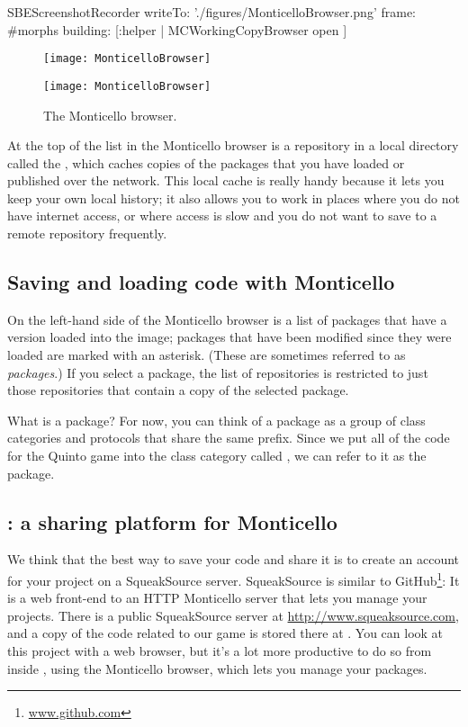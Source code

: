 \documentclass[a4paper,10pt,twoside]{book}
\begin{document}
\begin{ExecuteSmalltalkScript}
SBEScreenshotRecorder writeTo: './figures/MonticelloBrowser.png' frame: #morphs building: [:helper |
  MCWorkingCopyBrowser open
]
\end{ExecuteSmalltalkScript}
\begin{figure}[hbt]
\ifluluelse
	{\centerline {\texttt{[image: MonticelloBrowser]}}}
	{\centerline {\texttt{[image: MonticelloBrowser]}}}
\caption{The Monticello browser.
\label{fig:monticello1}}
\end{figure}

At the top of the list in the Monticello browser is a repository in a local directory called the , which caches copies of the packages that you have loaded or published over the network.
This local cache is really handy because it lets you keep your own local history; it also allows you to work in places where you do not have internet access, or where access is slow and you do not want to save to a remote repository frequently.


\subsection{Saving and loading code with Monticello}
On the left-hand side of the Monticello browser is a list of packages that have a version loaded into the image; packages that have been modified since they were loaded are marked with an asterisk.
(These are sometimes referred to as \emph{ packages}.)
If you select a package, the list of repositories is restricted to just those repositories that contain a copy of the selected package.

What is a package?
For now, you can think of a package as a group of class categories and protocols that share the same prefix.
Since we put all of the code for the Quinto game into the class category called , we can refer to it as the  package.


\subsection{: a sharing platform for Monticello}
We think that the best way to save your code and share it is to create an account for your project on a SqueakSource server.
SqueakSource is similar to GitHub\footnote{\url{www.github.com}}:
It is a web front-end to an HTTP Monticello server that lets you manage your projects.
There is a public SqueakSource server at \url{http://www.squeaksource.com}, and a copy of the code related to our game is stored there at \sbeSqueaksourceUrl.
You can look at this project with a web browser, but it's a lot more productive to do so from inside \squeak, using the Monticello browser, which lets you manage your packages.
\end{document}
